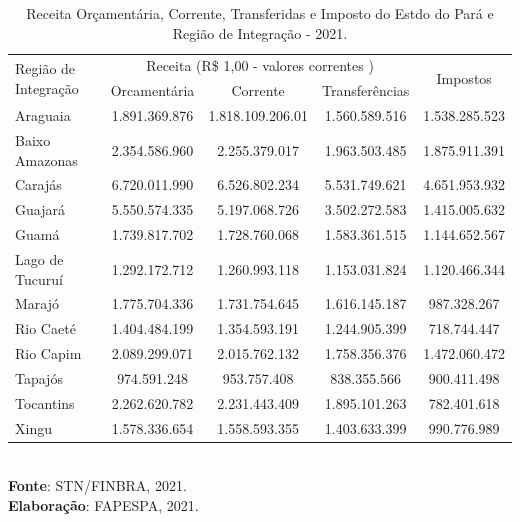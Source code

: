 \begin{table}[!htb]
\centering
    {
    \caption{Receita Orçamentária, Corrente, Transferidas e Imposto do Estdo do Pará e Região de Integração - 2021.}
    \label{obitos2}
    \vspace{0.1cm}
\begin{tabular}{l|c|c|c|c}
\hline\hline 
\multirow{2}{*}{Região de Integração} & \multicolumn{3}{c|}{Receita (R\$ 1,00 - valores correntes )}                                                     & \multirow{2}{*}{Impostos} \\ \cline{2-4}
                           & \multicolumn{1}{c|}{Orcamentária} & \multicolumn{1}{c|}{Corrente} & Transferências &  \\ 
\hline\hline                           
Araguaia           &  1.891.369.876 & 1.818.109.206.01 & 1.560.589.516 & 1.538.285.523 \\
Baixo Amazonas     &  2.354.586.960 & 2.255.379.017    & 1.963.503.485 & 1.875.911.391 \\
Carajás            &  6.720.011.990 & 6.526.802.234    & 5.531.749.621 & 4.651.953.932 \\
Guajará            &  5.550.574.335 & 5.197.068.726    & 3.502.272.583 & 1.415.005.632 \\
Guamá              &  1.739.817.702 & 1.728.760.068    & 1.583.361.515 & 1.144.652.567 \\
Lago de Tucuruí    &  1.292.172.712 & 1.260.993.118    & 1.153.031.824 & 1.120.466.344 \\
Marajó             &  1.775.704.336 & 1.731.754.645    & 1.616.145.187 & 987.328.267   \\
Rio Caeté          &  1.404.484.199 & 1.354.593.191    & 1.244.905.399 &  718.744.447  \\
Rio Capim          &  2.089.299.071 & 2.015.762.132    & 1.758.356.376 &  1.472.060.472 \\
Tapajós            &  974.591.248   & 953.757.408      & 838.355.566   &  900.411.498  \\
Tocantins          &  2.262.620.782 & 2.231.443.409    & 1.895.101.263 &  782.401.618 \\
Xingu              &  1.578.336.654 & 1.558.593.355    & 1.403.633.399 &  990.776.989 \\                   
\hline\hline
\end{tabular}}
\\ 
\hspace{-8.4cm}
\textbf{Fonte}: STN/FINBRA, 2021. \\
\hspace{-8.2cm}
\textbf{Elaboração}: FAPESPA, 2021.
\end{table}


